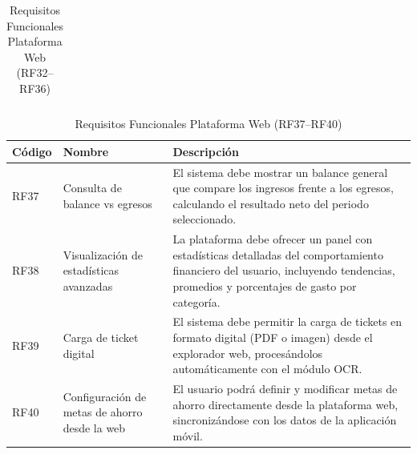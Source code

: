 \begin{itemize}
\begin{table}[H]
\begin{tabularx}{\textwidth}{@{} l l X @{}}
    \bottomrule
    \end{tabularx}
    \caption{Requisitos Funcionales Plataforma Web (RF32–RF36)}
    \end{table}

        \begin{table}[H]
    \centering
    \renewcommand{\arraystretch}{1.2}
    \begin{tabularx}{\textwidth}{@{} l l X @{}}
    \toprule
    \textbf{Código} & \textbf{Nombre} & \textbf{Descripción} \\
    \midrule
RF37 & Consulta de balance vs egresos &
El sistema debe mostrar un balance general que compare los ingresos frente a los egresos, calculando el resultado neto del periodo seleccionado. \\

RF38 & Visualización de estadísticas avanzadas &
La plataforma debe ofrecer un panel con estadísticas detalladas del comportamiento financiero del usuario, incluyendo tendencias, promedios y porcentajes de gasto por categoría. \\

RF39 & Carga de ticket digital &
El sistema debe permitir la carga de tickets en formato digital (PDF o imagen) desde el explorador web, procesándolos automáticamente con el módulo OCR. \\

RF40 & Configuración de metas de ahorro desde la web &
El usuario podrá definir y modificar metas de ahorro directamente desde la plataforma web, sincronizándose con los datos de la aplicación móvil. \\
    \bottomrule
    \end{tabularx}
    \caption{Requisitos Funcionales Plataforma Web (RF37–RF40)}
    \end{table}


\end{itemize}

